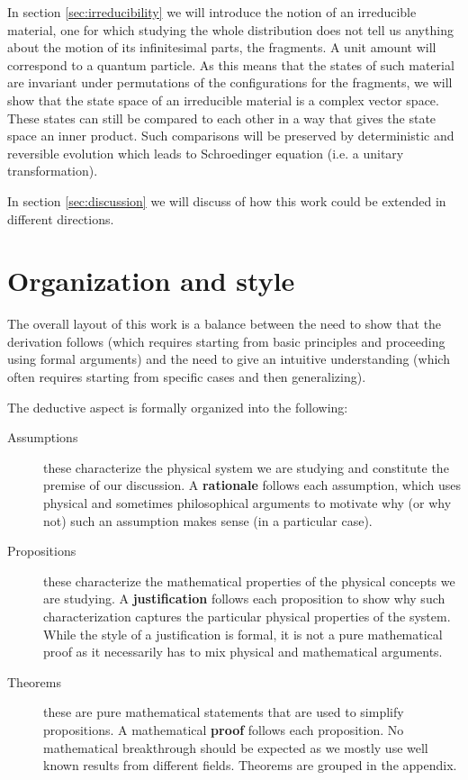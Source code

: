 \documentclass[aps,pra,10pt,twocolumn,floatfix,nofootinbib]{revtex4-1}
\numberwithin{equation}{section}
\theoremstyle{definition}
\begin{document}
In section \ref{sec:irreducibility} we will introduce the notion of an irreducible material, one for which studying the whole distribution does not tell us anything about the motion of its infinitesimal parts, the fragments. A unit amount will correspond to a quantum particle. As this means that the states of such material are invariant under permutations of the configurations for the fragments, we will show that the state space of an irreducible material is a complex vector space. These states can still be compared to each other in a way that gives the state space an inner product. Such comparisons will be preserved by deterministic and reversible evolution which leads to Schroedinger equation (i.e. a unitary transformation).

In section \ref{sec:discussion} we will discuss of how this work could be extended in different directions.

\section{Organization and style}

The overall layout of this work is a balance between the need to show that the derivation follows (which requires starting from basic principles and proceeding using formal arguments) and the need to give an intuitive understanding (which often requires starting from specific cases and then generalizing).

The deductive aspect is formally organized into the following:
\begin{description}
  \item[Assumptions] these characterize the physical system we are studying and constitute the premise of our discussion. A \textbf{rationale} follows each assumption, which uses physical and sometimes philosophical arguments to motivate why (or why not) such an assumption makes sense (in a particular case).
  
  \item[Propositions] these characterize the mathematical properties of the physical concepts we are studying. A \textbf{justification} follows each proposition to show why such characterization captures the particular physical properties of the system. While the style of a justification is formal, it is not a pure mathematical proof as it necessarily has to mix physical and mathematical arguments.
  
  \item[Theorems] these are pure mathematical statements that are used to simplify propositions. A mathematical \textbf{proof} follows each proposition. No mathematical breakthrough should be expected as we mostly use well known results from different fields. Theorems are grouped in the appendix.
\end{description}
\end{document}
